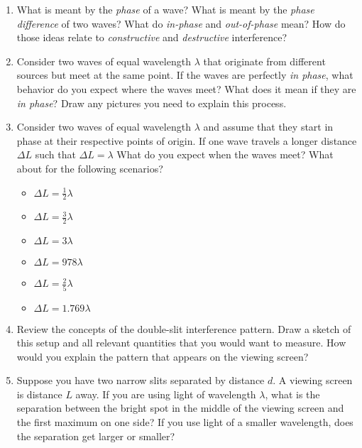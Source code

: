 \documentclass{tufte-handout}
\begin{document}
\begin{enumerate}

\item What is meant by the {\em phase} of a wave?  What is meant by the {\em phase difference} of two waves? What do {\em in-phase} and {\em out-of-phase} mean?  How do those ideas relate to {\em constructive} and {\em destructive} interference?

\item Consider two waves of equal wavelength $\lambda$ that originate from 
different sources but meet at the same point.
If the waves are perfectly {\it in phase}, what behavior do you expect where the waves meet?
What does it mean if they are {\it in phase}? Draw any pictures you need to explain this process.

\item Consider two waves of equal wavelength $\lambda$ and assume that they start in phase at their respective
points of origin. If one wave travels a longer distance $\Delta L$ such that $\Delta L = \lambda$
What do you expect when the waves meet? What about for the following scenarios?
\begin{itemize}[itemsep=0pt,parsep=0pt,topsep=0pt,partopsep=0pt]
    \item $\Delta L = \frac{1}{2}\lambda$
    \item $\Delta L = \frac{3}{2}\lambda$
    \item $\Delta L = 3\lambda$
    \item $\Delta L = 978\lambda$
    \item $\Delta L = \frac{2}{5}\lambda$
    \item $\Delta L = 1.769\lambda$
\end{itemize}

\item Review the concepts of the double-slit interference pattern. Draw a sketch of this setup and
all relevant quantities that you would want to measure. How would you explain the pattern that appears on the 
viewing screen?

\item Suppose you have two narrow slits separated by distance $d$. A viewing screen is distance $L$ away. If you are
using light of wavelength $\lambda$, what is the separation between the bright spot in the middle of
the viewing screen and the first maximum on one side? If you use light of a smaller wavelength, does
the separation get larger or smaller?
\end{enumerate}
\end{document}
